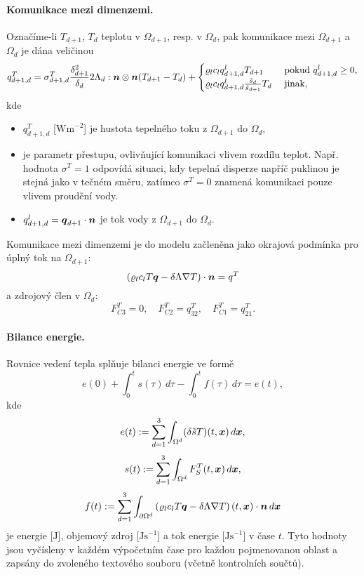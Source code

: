 \paragraph{Komunikace mezi dimenzemi.}
Označíme-li $T_{d+1}$, $T_d$ teplotu v $\Omega_{d+1}$, resp. v $\Omega_d$, pak komunikace mezi $\Omega_{d+1}$ a $\Omega_d$ je dána veličinou
\begin{equation}
  \label{e:inter_dim_flux_heat}
  q^T_{d+1,d} = \sigma^T_{d+1,d} \frac{\delta_{d+1}^2}{\delta_d}2\Lambda_d:\mathbf{\boldsymbol{n}}\otimes\mathbf{\boldsymbol{n}} ( T_{d+1} - T_d)
  + \begin{cases} \varrho_l c_l q^l_{d+1,d} T_{d+1} & \mbox{ pokud }q^l_{d+1,d}\ge 0,\\\varrho_l c_l q^l_{d+1,d} \frac{\tilde s_d}{\tilde s_{d+1}} T_d & \mbox{ jinak},\end{cases}
\end{equation}
kde
\begin{itemize}
\item $q^T_{d+1,d}$ [$\mathrm{Wm}^{-2}$] je hustota tepelného toku z $\Omega_{d+1}$ do $\Omega_d$,
\item {} \units{}{}{} je parametr přestupu, ovlivňující komunikaci vlivem rozdílu teplot.
Např. hodnota $\sigma^T=1$ odpovídá situaci, kdy tepelná disperze napříč puklinou je stejná jako v tečném směru, zatímco $\sigma^T=0$ znamená komunikaci pouze vlivem proudění vody.
\item $q^l_{d+1,d}=\mathbf{\boldsymbol{q}}_{d+1}\cdot\mathbf{\boldsymbol{n}}$ je tok vody z $\Omega_{d+1}$ do $\Omega_d$.
\end{itemize}
Komunikace mezi dimenzemi je do modelu začleněna jako okrajová podmínka pro úplný tok na $\Omega_{d+1}$:
\begin{equation}
\label{e:heat_FC}
\left(\varrho_l c_l T \mathbf{\boldsymbol{q}} - \delta\Lambda\nabla T\right)\cdot\mathbf{\boldsymbol{n}} = q^T
\end{equation}
a zdrojový člen v $\Omega_d$:
\begin{equation}
F^T_{C3} = 0,\quad
F^T_{C2} = q^T_{32},\quad
F^T_{C1} = q^T_{21}.
\end{equation}




\paragraph{Bilance energie.}
Rovnice vedení tepla splňuje bilanci energie ve formě
$$ e(0) + \int_0^t s(\tau) \,d\tau - \int_0^t f(\tau) \,d\tau = e(t), $$
kde
$$ e(t) := \sum_{d=1}^3\int_{\Omega^d}(\delta \tilde s T)(t,\mathbf{\boldsymbol{x}})\,d\mathbf{\boldsymbol{x}}, $$
$$ s(t) := \sum_{d=1}^3\int_{\Omega^d}F_S^T(t,\mathbf{\boldsymbol{x}})\,d\mathbf{\boldsymbol{x}}, $$
$$ f(t) := \sum_{d=1}^3\int_{\partial\Omega^d}\left(\varrho_l c_l T\mathbf{\boldsymbol{q}} - \delta\Lambda\nabla T\right)(t,\mathbf{\boldsymbol{x}})\cdot\mathbf{\boldsymbol{n}} \,d\mathbf{\boldsymbol{x}} $$
je energie [$\mathrm{J}$], objemový zdroj [$\mathrm{Js}^{-1}$] a tok energie [$\mathrm{Js}^{-1}$] v čase $t$.
Tyto hodnoty jsou vyčísleny v každém výpočetním čase pro každou pojmenovanou oblast a zapsány do zvoleného textového souboru (včetně kontrolních součtů).





